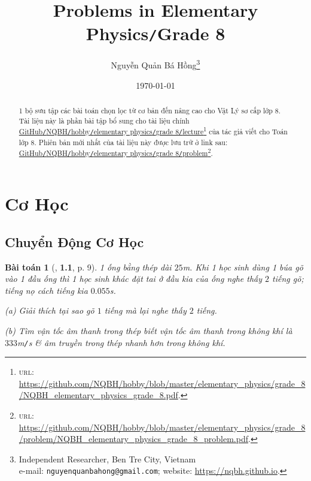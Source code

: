 \documentclass{article}
\title{Problems in Elementary Physics\texttt{/}Grade 8}
\author{Nguyễn Quản Bá Hồng\footnote{Independent Researcher, Ben Tre City, Vietnam\\e-mail: \texttt{nguyenquanbahong@gmail.com}; website: \url{https://nqbh.github.io}.}}
\date{\today}
\numberwithin{equation}{section}
\newtheorem{baitoan}{Bài toán}[section]
\begin{document}
\maketitle
\begin{abstract}
	1 bộ sưu tập các bài toán chọn lọc từ cơ bản đến nâng cao cho Vật Lý sơ cấp lớp 8. Tài liệu này là phần bài tập bổ sung cho tài liệu chính \href{https://github.com/NQBH/hobby/blob/master/elementary_physics/grade_8/NQBH_elementary_physics_grade_8.pdf}{GitHub\texttt{/}NQBH\texttt{/}hobby\texttt{/}elementary physics\texttt{/}grade 8\texttt{/}lecture}\footnote{\textsc{url}: \url{https://github.com/NQBH/hobby/blob/master/elementary_physics/grade_8/NQBH_elementary_physics_grade_8.pdf}.} của tác giả viết cho Toán lớp 8. Phiên bản mới nhất của tài liệu này được lưu trữ ở link sau: \href{https://github.com/NQBH/hobby/blob/master/elementary_physics/grade_8/problem/NQBH_elementary_physics_grade_8_problem.pdf}{GitHub\texttt{/}NQBH\texttt{/}hobby\texttt{/}elementary physics\texttt{/}grade 8\texttt{/}problem}\footnote{\textsc{url}: \url{https://github.com/NQBH/hobby/blob/master/elementary_physics/grade_8/problem/NQBH_elementary_physics_grade_8_problem.pdf}.}.
\end{abstract}
\tableofcontents
\newpage


\section{Cơ Học}

\subsection{Chuyển Động Cơ Học}

\begin{baitoan}[\cite{Van2022}, \textbf{1.1}, p. 9]
	1 ống bằng thép dài $25$\emph{m}. Khi 1 học sinh dùng 1 búa gõ vào 1 đầu ống thì 1 học sinh khác đặt tai ở đầu kia của ống nghe thấy $2$ tiếng gõ; tiếng nọ cách tiếng kia $0.055$\emph{s}.
	\begin{enumerate*}
		\item[(a)] Giải thích tại sao gõ $1$ tiếng mà lại nghe thấy $2$ tiếng.
		\item[(b)] Tìm vận tốc âm thanh trong thép biết vận tốc âm thanh trong không khí là $333$\emph{m\texttt{/}s} \& âm truyền trong thép nhanh hơn trong không khí.
	\end{enumerate*}
\end{baitoan}
\end{document}
